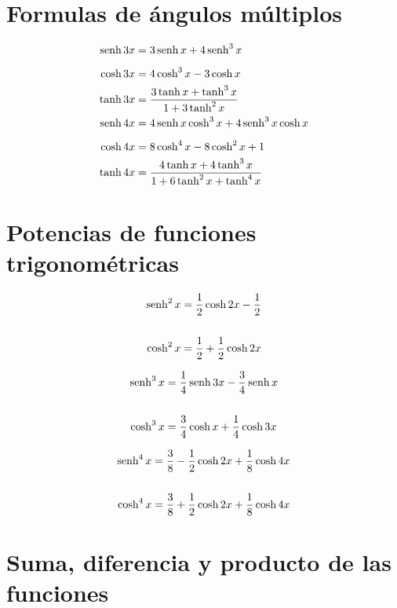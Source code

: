 \section*{Formulas de ángulos múltiplos}

\begin{align*}
	\operatorname{senh} 3x &= 3\operatorname{senh} x + 4\operatorname{senh}^3 x \\[5pt]
	\cosh 3x &= 4\cosh^3 x - 3\cosh x \\
	\tanh 3x &= \frac{3\tanh x+\tanh^3 x}{1+3\tanh^2 x}\\
	\operatorname{senh} 4x &= 4\operatorname{senh} x \cosh^3 x + 4 \operatorname{senh}^3 x \cosh x \\[5pt]
	\cosh 4x &= 8\cosh^4 x - 8\cosh^2 x + 1 \\
	\tanh 4x &= \frac{4\tanh x + 4\tanh^3 x}{1+6\tanh^2 x + \tanh^4 x}\\
\end{align*}

\section*{Potencias de funciones trigonométricas}

\begin{minipage}[c]{0.33\textwidth}
\begin{align*}
\operatorname{senh}^2 x &= \frac{1}{2} \cosh 2x -\frac{1}{2}\\\\
\cosh^2 x &= \frac{1}{2}+ \frac{1}{2} \cosh 2x
\end{align*}

\end{minipage} 
\begin{minipage}[c]{0.33\textwidth}
\begin{align*}
\operatorname{senh}^3 x &= \frac{1}{4} \operatorname{senh} 3x - \frac{3}{4}\operatorname{senh} x\\\\
\cosh^3 x &= \frac{3}{4}\cosh x+ \frac{1}{4} \cosh 3x
\end{align*}
\end{minipage}
\begin{minipage}[c]{0.33\textwidth}
\begin{align*}
\operatorname{senh}^4 x &= \frac{3}{8}- \frac{1}{2} \cosh 2x + \frac{1}{8}\cosh 4x\\\\
\cosh^4 x &= \frac{3}{8}+ \frac{1}{2} \cosh 2x + \frac{1}{8}\cosh 4x
\end{align*}
\end{minipage}

\section*{Suma, diferencia y producto de las funciones}

